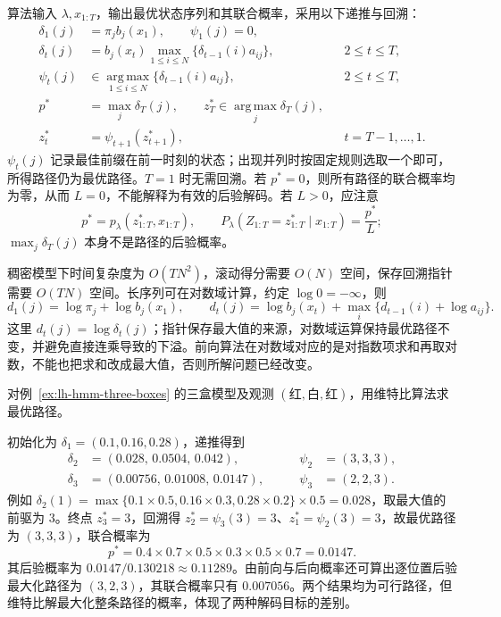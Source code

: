 算法输入 $\lambda,x_{1:T}$，输出最优状态序列和其联合概率，采用以下递推与回溯：
\begin{align}
\label{eq:lh-hmm-viterbi-init}
 \delta_1(j)&=\pi_jb_j(x_1),\qquad \psi_1(j)=0,\\
\label{eq:lh-hmm-viterbi-rec}
 \delta_t(j)&=b_j(x_t)\max_{1\leq i\leq N}\{\delta_{t-1}(i)a_{ij}\},
 &&2\leq t\leq T,\\
\label{eq:lh-hmm-viterbi-pointer}
 \psi_t(j)&\in\operatorname*{arg\,max}_{1\leq i\leq N}\{\delta_{t-1}(i)a_{ij}\},
 &&2\leq t\leq T,\\
\label{eq:lh-hmm-viterbi-end}
 p^*&=\max_j\delta_T(j),\qquad
 z_T^*\in\operatorname*{arg\,max}_{j}\delta_T(j),\\
\label{eq:lh-hmm-viterbi-backtrack}
 z_t^*&=\psi_{t+1}(z_{t+1}^*),
 &&t=T-1,\ldots,1.
\end{align}
$\psi_t(j)$ 记录最佳前缀在前一时刻的状态；出现并列时按固定规则选取一个即可，所得路径仍为最优路径。$T=1$ 时无需回溯。若 $p^*=0$，则所有路径的联合概率均为零，从而 $L=0$，不能解释为有效的后验解码。若 $L>0$，应注意
\[
 p^*=p_\lambda(z_{1:T}^*,x_{1:T}),\qquad
 P_\lambda(Z_{1:T}=z_{1:T}^*\mid x_{1:T})=\frac{p^*}{L};
\]
$\max_j\delta_T(j)$ 本身不是路径的后验概率。

稠密模型下时间复杂度为 $O(TN^2)$，滚动得分需要 $O(N)$ 空间，保存回溯指针需要 $O(TN)$ 空间。长序列可在对数域计算，约定 $\log0=-\infty$，则
\[
 d_1(j)=\log\pi_j+\log b_j(x_1),\qquad
 d_t(j)=\log b_j(x_t)+\max_i\{d_{t-1}(i)+\log a_{ij}\}.
\]
这里 $d_t(j)=\log\delta_t(j)$；指针保存最大值的来源，对数域运算保持最优路径不变，并避免直接连乘导致的下溢。前向算法在对数域对应的是对指数项求和再取对数，不能也把求和改成最大值，否则所解问题已经改变。

\begin{example}
\label{ex:lh-hmm-viterbi}
对例~\ref{ex:lh-hmm-three-boxes} 的三盒模型及观测 $(\text{红},\text{白},\text{红})$，用维特比算法求最优路径。
\end{example}
\begin{solve}
初始化为 $\delta_1=(0.1,0.16,0.28)$，递推得到
\[
 \begin{aligned}
 \delta_2&=(0.028,\,0.0504,\,0.042),&\qquad\psi_2&=(3,3,3),\\
 \delta_3&=(0.00756,\,0.01008,\,0.0147),&\qquad\psi_3&=(2,2,3).
 \end{aligned}
\]
例如 $\delta_2(1)=\max\{0.1\times0.5,0.16\times0.3,0.28\times0.2\}\times0.5=0.028$，取最大值的前驱为 $3$。终点 $z_3^*=3$，回溯得 $z_2^*=\psi_3(3)=3$、$z_1^*=\psi_2(3)=3$，故最优路径为 $(3,3,3)$，联合概率为
\[
 p^*=0.4\times0.7\times0.5\times0.3\times0.5\times0.7=0.0147.
\]
其后验概率为 $0.0147/0.130218\approx0.11289$。由前向与后向概率还可算出逐位置后验最大化路径为 $(3,2,3)$，其联合概率只有 $0.007056$。两个结果均为可行路径，但维特比解最大化整条路径的概率，体现了两种解码目标的差别。
\end{solve}

